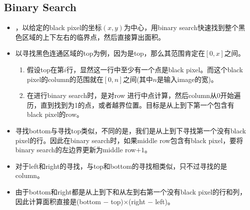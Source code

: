 \subsection{Binary Search}
\begin{itemize}
\item ，以给定的black pixel的坐标$ (x, y) $为中心，用binary search快速找到整个黑色区域的上下左右的临界点，然后直接算出面积。
\item 以寻找黑色连通区域的top为例，因为是top，那么其范围肯定在$ [0, x] $之间。
\begin{enumerate}
\item 假设top在第$ i $行，显然这一行中至少有一个点是black pixel。而这个black pixel的column的范围就在$[0, n]$之间(其中$n$是输入image的宽)。
\item 在进行binary search时，是对row
进行中点计算，然后column从0开始遍历，直到找到为1的点，或者越界位置。目标是从上到下第一个包含有black pixel的row。
\end{enumerate}
\item 寻找bottom与寻找top类似，不同的是，我们是从上到下寻找第一个没有black pixel的行。因此在binary search时，如果middle row包含有black pixel，要将binary search的左边界更新为middle row$  + 1 $。
\item 对于left和right的寻找，与top和bottom的寻找相类似，只不过寻找的是column。
\item 由于bottom和right都是从上到下和从左到右第一个没有black pixel的行和列，因此计算面积直接是(bottom $-$ top)$\times$(right $ - $ left)。
\end{itemize}
